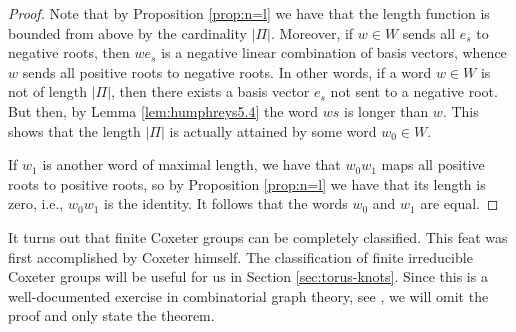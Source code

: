 \documentclass{article}
\theoremstyle{definition}
\begin{document}
\begin{proof}
Note that by Proposition \ref{prop:n=l} we have that the length function is bounded from above by the cardinality $|\Pi|$. Moreover, if $w \in W$ sends all $e_s$ to negative roots, then $we_s$ is a negative linear combination of basis vectors, whence $w$ sends all positive roots to negative roots. In other words, if a word $w \in W$ is not of length $|\Pi|$, then there exists a basis vector $e_s$ not sent to a negative root. But then, by Lemma \ref{lem:humphreys5.4} the word $ws$ is longer than $w$. This shows that the length $|\Pi|$ is actually attained by some word $w_0 \in W$.

If $w_1$ is another word of maximal length, we have that $w_0w_1$ maps all positive roots to positive roots, so by Proposition \ref{prop:n=l} we have that its length is zero, i.e., $w_0w_1$ is the identity. It follows that the words $w_0$ and $w_1$ are equal.
\end{proof}

It turns out that finite Coxeter groups can be completely classified. This feat was first accomplished by Coxeter \cite{coxeter1935} himself. The classification of finite irreducible Coxeter groups will be useful for us in Section \ref{sec:torus-knots}. Since this is a well-documented exercise in combinatorial graph theory, see \cite{humphreys1990}, we will omit the proof and only state the theorem.
\end{document}
